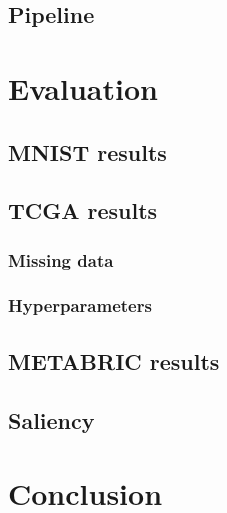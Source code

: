 \documentclass[12pt,a4paper,twoside,openright]{report}
\renewcommand{\baselinestretch}{1.1}    %
\begin{document}
\section{Pipeline}

\chapter{Evaluation}

\section{MNIST results}

\section{TCGA results}

\subsection{Missing data}

\subsection{Hyperparameters}

\section{METABRIC results}

\section{Saliency}

\chapter{Conclusion}



 
\end{document}
